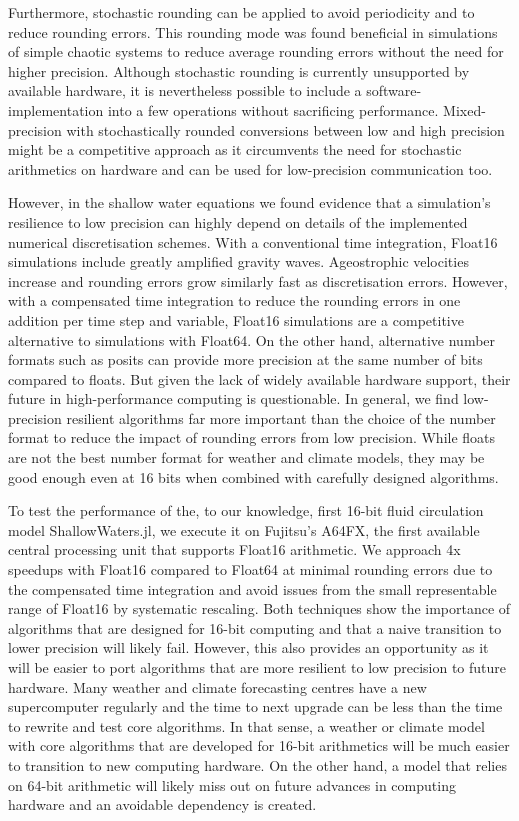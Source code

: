 Furthermore, stochastic rounding can be applied to avoid periodicity and to reduce rounding errors. This rounding mode was found beneficial in 
simulations of simple chaotic systems to reduce average rounding errors without the need for higher precision.  Although stochastic rounding is
currently unsupported by available hardware, it is nevertheless possible to include a software-implementation into a few operations without
sacrificing performance. Mixed-precision with stochastically rounded conversions between low and high precision might be a competitive
approach as it circumvents the need for stochastic arithmetics on hardware and can be used for low-precision communication too.

However, in the shallow water equations we found evidence that a simulation's resilience to low precision can highly depend on details of the
implemented numerical discretisation schemes. With a conventional time integration, Float16 simulations include greatly amplified gravity waves.
Ageostrophic velocities increase and rounding errors grow similarly fast as discretisation errors. However, with a compensated time integration to
reduce the rounding errors in one addition per time step and variable, Float16 simulations are a competitive alternative to simulations with Float64.
On the other hand, alternative number formats such as posits can provide more precision at the same number of bits compared to floats.
But given the lack of widely available hardware support, their future in high-performance computing is questionable. In general, we find
low-precision resilient algorithms far more important than the choice of the number format to reduce the impact of rounding errors from
low precision. While floats are not the best number format for weather and climate models, they may be good enough even at 16 bits when
combined with carefully designed algorithms.

To test the performance of the, to our knowledge, first 16-bit fluid circulation model ShallowWaters.jl, we execute it on Fujitsu's A64FX, the first
available central processing unit that supports Float16 arithmetic. We approach 4x speedups with Float16 compared to Float64 at minimal
rounding errors due to the compensated time integration and avoid issues from the small representable range of Float16 by systematic rescaling.
Both techniques show the importance of algorithms that are designed for 16-bit computing and that a naive transition to lower precision will
likely fail. However, this also provides an opportunity as it will be easier to port algorithms that are more resilient to low precision to future hardware.
Many weather and climate forecasting centres have a new supercomputer regularly and the time to next upgrade can be less than
the time to rewrite and test core algorithms. In that sense, a weather or climate model with core algorithms that are developed for 16-bit
arithmetics will be much easier to transition to new computing hardware. On the other hand, a model that relies on 64-bit arithmetic will
likely miss out on future advances in computing hardware and an avoidable dependency is created.

